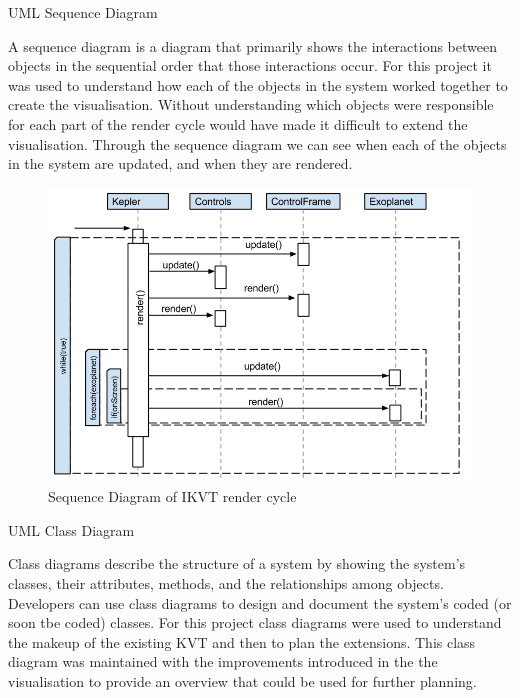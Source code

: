 \begin{enumerate}
\clearpage
{\bf \item UML Sequence Diagram}
  A sequence diagram is a diagram that primarily shows the interactions between
objects in the sequential order that those interactions occur.
For this project it was used to understand how each of the objects in the system
worked together to create the visualisation. Without understanding which objects
were responsible for each part of the render cycle would have made it difficult
to extend the visualisation. Through the sequence diagram we can see when each
of the objects in the system are updated, and when they are rendered. 
   \begin{figure}[H]
  \centering
      \includegraphics[width=1\textwidth]{images/sequence.png}
  \caption{Sequence Diagram of IKVT render cycle}  
    \label{fig:sequenceDiagram}
\end{figure}
\clearpage
 {\bf \item UML Class Diagram}
 Class diagrams describe the structure of a system by showing the system's
classes, their attributes, methods, and the relationships among objects.
 Developers can use class diagrams to design and document the system's coded (or
soon tbe coded) classes. For this project class diagrams were used to understand
the makeup of the existing KVT and then to plan the extensions. This class
diagram was maintained with the improvements introduced in the the visualisation
to provide an overview that could be used for further planning.
 \begin{figure}[H]
  \centering

\end{figure}
\end{enumerate}

